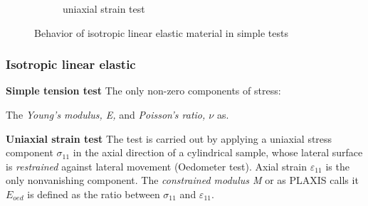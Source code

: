 \documentclass[notes]{beamer}
\begin{document}
\begin{frame}
\begin{figure}[t!]
\begin{subfigure}[t]{0.5\textwidth}
			 \caption{uniaxial strain test}
	    \end{subfigure}
	    \caption{Behavior of isotropic linear elastic material in simple tests}
	\end{figure}
\end{frame}

\begin{frame}
\frametitle{Isotropic linear elastic}
\textbf{Simple tension test}
The only non-zero components of stress: 

The \textit{Young's modulus, E,}  and \textit{Poisson's ratio, $\nu$} as. 

\textbf{Uniaxial strain test}
The test is carried out by applying a uniaxial stress component $\sigma_{11}$ in the axial direction of a cylindrical sample, whose lateral surface is \textit{restrained} against lateral movement (Oedometer test). Axial strain $\varepsilon_{11}$ is the only nonvanishing component. The \textit{constrained modulus M} or as PLAXIS calls it $E_{oed}$ is defined as the ratio between $\sigma_{11}$ and $\varepsilon_11$.
\end{frame}
\end{document}
